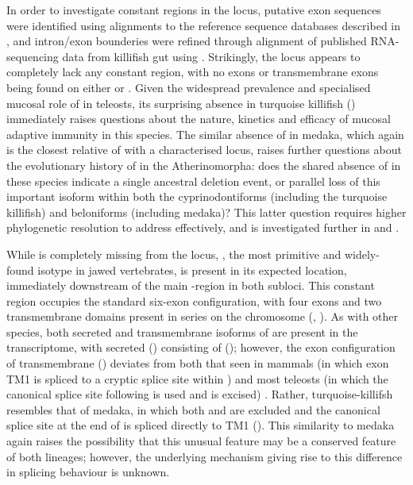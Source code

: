 	In order to investigate constant regions in the \nfu \igh{} locus, putative exon sequences were identified using  alignments to the reference sequence databases described in , and intron/exon bounderies were refined through alignment of published RNA-sequencing data from killifish gut using  . Strikingly, the \nfu \igh{} locus appears to completely lack any  constant region, with no \cz{} exons or  transmembrane exons being found on either  or . Given the widespread prevalence and specialised mucosal role of  in teleosts, its surprising absence in turquoise killifish () immediately raises questions about the nature, kinetics and efficacy of mucosal adaptive immunity in this species. The similar absence of  in medaka, which again is the closest relative of \Nfu with a characterised locus, raises further questions about the evolutionary history of  in the Atherinomorpha: does the shared absence of  in these species indicate a single ancestral deletion event, or parallel loss of this important isoform within both the cyprinodontiforms (including the turquoise killifish) and beloniforms (including medaka)? This latter question requires higher phylogenetic resolution to address effectively, and is investigated further in  and .
	
	While  is completely missing from the \Nfu \igh{} locus, , the most primitive and widely-found isotype in jawed vertebrates, is present in its expected location, immediately downstream of the main \jh-region in both subloci. This constant region occupies the standard six-exon configuration, with four \cm{} exons and two transmembrane domains present in series on the chromosome (, ). As with other species, both secreted and transmembrane isoforms of  are present in the transcriptome, with secreted  () consisting of  (); however, the exon configuration of transmembrane  () deviates from both that seen in mammals (in which exon TM1 is spliced to a cryptic splice site within ) and most teleosts (in which the canonical splice site following  is used and  is excised) \parencite{fillatreau2013astonishing}. Rather, turquoise-killifsh  resembles that of medaka, in which both  and  are excluded and the canonical splice site at the end of  is spliced directly to TM1 (). This similarity to medaka again raises the possibility that this unusual feature may be a conserved feature of both lineages; however, the underlying mechanism giving rise to this difference in splicing behaviour is unknown.
	
